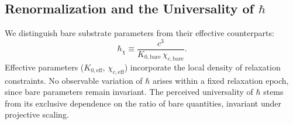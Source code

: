 \subsection{Renormalization and the Universality of
\texorpdfstring{$\hbar$}{ℏ}}
\label{subsec:renormalization-hbar}

We distinguish bare substrate parameters from their effective
counterparts:
\begin{equation}
  \hbar_\chi
  \equiv
  \frac{c^3}
       {K_{0,\mathrm{bare}}\,\chi_{c,\mathrm{bare}}}.
  \label{eq:hbar-chi}
\end{equation}
Effective parameters ($K_{0,\mathrm{eff}}$,
$\chi_{c,\mathrm{eff}}$) incorporate the local density of relaxation
constraints.
No observable variation of $\hbar$ arises within a fixed relaxation
epoch, since bare parameters remain invariant.
The perceived universality of $\hbar$ stems from its exclusive
dependence on the ratio of bare quantities, invariant under projective
scaling.
